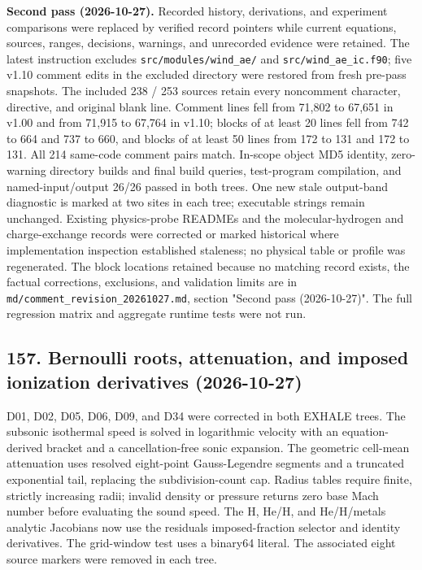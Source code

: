 \documentclass[english,a4paper]{my_memo}
\begin{document}
\textbf{Second pass (2026-10-27).} Recorded history, derivations, and experiment comparisons were replaced by verified record pointers while current equations, sources, ranges, decisions, warnings, and unrecorded evidence were retained. The latest instruction excludes \texttt{src/modules/wind\_ae/} and \texttt{src/wind\_ae\_ic.f90}; five v1.10 comment edits in the excluded directory were restored from fresh pre-pass snapshots. The included 238 / 253 sources retain every noncomment character, directive, and original blank line. Comment lines fell from 71,802 to 67,651 in v1.00 and from 71,915 to 67,764 in v1.10; blocks of at least 20 lines fell from 742 to 664 and 737 to 660, and blocks of at least 50 lines from 172 to 131 and 172 to 131. All 214 same-code comment pairs match. In-scope object MD5 identity, zero-warning directory builds and final build queries, test-program compilation, and named-input/output 26/26 passed in both trees. One new stale output-band diagnostic is marked at two sites in each tree; executable strings remain unchanged. Existing physics-probe READMEs and the molecular-hydrogen and charge-exchange records were corrected or marked historical where implementation inspection established staleness; no physical table or profile was regenerated. The block locations retained because no matching record exists, the factual corrections, exclusions, and validation limits are in \texttt{md/comment\_revision\_20261027.md}, section "Second pass (2026-10-27)". The full regression matrix and aggregate runtime tests were not run.

\subsection{157. Bernoulli roots, attenuation, and imposed ionization derivatives (2026-10-27)}\label{157-bernoulli-roots-attenuation-and-imposed-ionization-derivatives-2026-10-27}

D01, D02, D05, D06, D09, and D34 were corrected in both EXHALE trees. The subsonic isothermal speed is solved in logarithmic velocity with an equation-derived bracket and a cancellation-free sonic expansion. The geometric cell-mean attenuation uses resolved eight-point Gauss-Legendre segments and a truncated exponential tail, replacing the subdivision-count cap. Radius tables require finite, strictly increasing radii; invalid density or pressure returns zero base Mach number before evaluating the sound speed. The H, He/H, and He/H/metals analytic Jacobians now use the residual\textquotesingle s imposed-fraction selector and identity derivatives. The grid-window test uses a binary64 literal. The associated eight source markers were removed in each tree.
\end{document}
